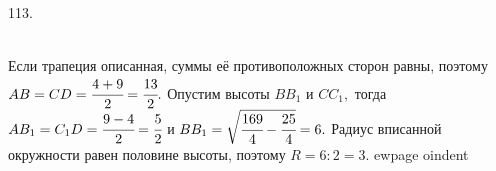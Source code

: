 113. \begin{figure}[ht!]
\end{figure}\\
Если трапеция описанная, суммы её противоположных сторон равны, поэтому $AB=CD=\cfrac{4+9}{2}=\cfrac{13}{2}.$ Опустим высоты $BB_1$ и $CC_1,$ тогда $AB_1=C_1D=\cfrac{9-4}{2}=\cfrac{5}{2}$ и $BB_1=\sqrt{\cfrac{169}{4}-\cfrac{25}{4}}=6.$ Радиус вписанной окружности равен половине высоты, поэтому $R=6:2=3.$
ewpage
oindent

